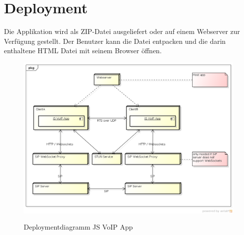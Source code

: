 \section{Deployment}
Die Applikation wird als ZIP-Datei ausgeliefert oder auf einem Webserver zur Verfügung gestellt. Der Benutzer kann die Datei entpacken und die darin enthaltene HTML Datei mit seinem Browser öffnen.
\begin{figure}[h]
	\centering
	\includegraphics[width=1\textwidth]{img/deployment.png}
	\label{img:deployment}
	\caption{Deploymentdiagramm JS VoIP App}
\end{figure}
